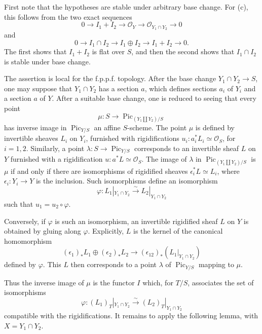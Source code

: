 \documentclass[11pt]{article}
\providecommand{\Pic}{\operatorname{Pic}}
\begin{document}
First note that the hypotheses are stable under arbitrary base change. For (c), this follows from the two exact sequences
\[
  0\longrightarrow I_1+I_2\longrightarrow \mathcal O_Y\longrightarrow \mathcal O_{Y_1\cap Y_2}\longrightarrow 0
\]
and
\[
  0\longrightarrow I_1\cap I_2\longrightarrow I_1\oplus I_2\longrightarrow I_1+I_2\longrightarrow 0.
\]
The first shows that \(I_1+I_2\) is flat over \(S\), and then the second shows that \(I_1\cap I_2\) is stable under base change.

The assertion is local for the f.p.p.f. topology. After the base change \(Y_1\cap Y_2\to S\), one may suppose that \(Y_1\cap Y_2\) has a section \(a\), which defines sections \(a_i\) of \(Y_i\) and a section \(a\) of \(Y\). After a suitable base change, one is reduced to seeing that every point
\[
  \mu:S\longrightarrow \Pic_{(Y_1\amalg Y_2)/S}
\]
has inverse image in \(\Pic_{Y/S}\) an affine \(S\)-scheme. The point \(\mu\) is defined by invertible sheaves \(L_i\) on \(Y_i\), furnished with rigidifications \(u_i:a_i^*L_i\simeq\mathcal O_S\), for \(i=1,2\). Similarly, a point \(\lambda:S\to\Pic_{Y/S}\) corresponds to an invertible sheaf \(L\) on \(Y\) furnished with a rigidification \(u:a^*L\simeq\mathcal O_S\). The image of \(\lambda\) in \(\Pic_{(Y_1\amalg Y_2)/S}\) is \(\mu\) if and only if there are isomorphisms of rigidified sheaves \(\epsilon_i^*L\simeq L_i\), where \(\epsilon_i:Y_i\to Y\) is the inclusion. Such isomorphisms define an isomorphism
\[
  \varphi:L_1|_{Y_1\cap Y_2}\xrightarrow{\sim}L_2|_{Y_1\cap Y_2}
\]
such that \(u_1=u_2\circ\varphi\).

Conversely, if \(\varphi\) is such an isomorphism, an invertible rigidified sheaf \(L\) on \(Y\) is obtained by gluing along \(\varphi\). Explicitly, \(L\) is the kernel of the canonical homomorphism
\[
  (\epsilon_1)_*L_1\oplus(\epsilon_2)_*L_2
  \longrightarrow
  (\epsilon_{12})_*(L_1|_{Y_1\cap Y_2})
\]
defined by \(\varphi\). This \(L\) then corresponds to a point \(\lambda\) of \(\Pic_{Y/S}\) mapping to \(\mu\).

Thus the inverse image of \(\mu\) is the functor \(I\) which, for \(T/S\), associates the set of isomorphisms
\[
  \varphi:(L_1)_T|_{Y_1\cap Y_2}\xrightarrow{\sim}(L_2)_T|_{Y_1\cap Y_2}
\]
compatible with the rigidifications. It remains to apply the following lemma, with \(X=Y_1\cap Y_2\).
\end{document}

